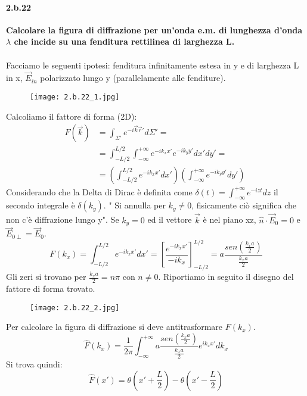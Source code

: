 \documentclass[twoside]{article}
\begin{document}
\paragraph{2.b.22}\textbf{Calcolare la figura di diffrazione per un'onda e.m. di lunghezza d'onda $\lambda$ che incide su una fenditura rettilinea di larghezza L.}\\ \\
Facciamo le seguenti ipotesi: fenditura infinitamente estesa in y e di larghezza L in x, $\vec{E}_{in}$ polarizzato lungo y (parallelamente alle fenditure).
\begin{figure}[H]
    \centering
      \texttt{[image: 2.b.22\_1.jpg]}
\end{figure}
Calcoliamo il fattore di forma (2D):
\begin{align*}
    F(\vec{k})&=\int_{\Sigma'}e^{-i \vec{k} \vec{r}'} d\Sigma'=\\
    &=\int_{-L/2}^{L/2} \int_{-\infty}^{+\infty}e^{-i k_x x'}e^{-i k_y y'} dx'dy'=\\
    &=\left(\int_{-L/2}^{L/2} e^{-i k_x x'} dx' \right)\left(\int_{-\infty}^{+\infty}e^{-i k_y y'} dy'\right)\;
\end{align*}
Considerando che la Delta di Dirac è definita come  $\delta(t)=\int_{-\infty}^{+\infty} e^{-izt}dz$ il secondo integrale è  $\delta(k_y)$. " Si annulla per $k_y\ne 0$, fisicamente ciò significa che non c'è diffrazione lungo y". Se $k_y=0$ ed il vettore $\vec{k}$ è nel piano xz, $\hat{n}\cdot \vec{E}_0=0$ e $\vec{E}_{0\perp}=\vec{E}_0$.
\begin{equation*}
    F(k_x)=\int_{-L/2}^{L/2} e^{-i k_x x'} dx'= \left[ \frac{e^{-ik_x x'}}{-i k_x}  \right]^{L/2}_{-L/2}= a\frac{sen(\frac{k_x a}{2})}{\frac{k_x a}{2}}
\end{equation*}
Gli zeri si trovano per $\frac{k_x a}{2}=n\pi$ con $n \not= 0$.
Riportiamo in seguito il disegno del fattore di forma trovato.
\begin{figure}[H]
    \centering
      \texttt{[image: 2.b.22\_2.jpg]}
\end{figure}
Per calcolare la figura di diffrazione si deve antitrasformare $F(k_x)$.
\begin{equation*}
   \hat{F}(k_x)= \frac{1}{2 \pi}\int_{-\infty}^{+\infty} 
   a\frac{sen(\frac{k_x a}{2})}{\frac{k_x a}{2}}
   e^{ik_xx'}dk_x
\end{equation*}
Si trova quindi:
\begin{equation*}
    \hat{F}(x')=\theta\left(x'+\frac{L}{2}\right)-\theta\left(x'-\frac{L}{2}\right)
\end{equation*}
\end{document}

